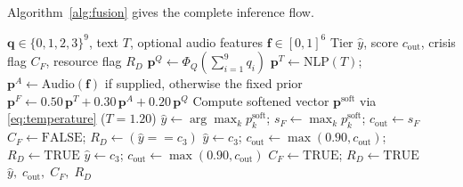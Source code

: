 \documentclass[10pt, conference, letterpaper]{IEEEtran}
\begin{document}
\begin{table}[!t]
\caption{HRE Module: Complete Decision Matrix}
\label{tab:hre}
\centering
{}
\end{table}

Algorithm~\ref{alg:fusion} gives the complete inference flow.

\begin{algorithm}[!t]
\caption{MindScreen Tri-Modal Inference with HRE}
\label{alg:fusion}
\begin{algorithmic}[1]
\REQUIRE $\mathbf{q} \in \{0,1,2,3\}^9$, text $T$, optional audio features $\mathbf{f} \in [0,1]^6$
\ENSURE Tier $\hat{y}$, score $c_{\text{out}}$, crisis flag $C_F$, resource flag $R_D$
\STATE $\mathbf{p}^Q \leftarrow \Phi_Q\!\left(\sum_{i=1}^9 q_i\right)$
\STATE $\mathbf{p}^T \leftarrow \text{NLP}(T)$;\; $\mathbf{p}^A \leftarrow \text{Audio}(\mathbf{f})$ if supplied, otherwise the fixed prior
\STATE $\mathbf{p}^F \leftarrow 0.50\,\mathbf{p}^T + 0.30\,\mathbf{p}^A + 0.20\,\mathbf{p}^Q$
\STATE Compute softened vector $\mathbf{p}^{\text{soft}}$ via \eqref{eq:temperature} ($T=1.20$)
\STATE $\hat{y} \leftarrow \arg\max_k p_k^{\text{soft}}$;\; $s_F \leftarrow \max_k p_k^{\text{soft}}$;\; $c_{\text{out}} \leftarrow s_F$
\STATE $C_F \leftarrow \text{FALSE}$;\; $R_D \leftarrow (\hat{y} == c_3)$
  \STATE $\hat{y} \leftarrow c_3$;\; $c_{\text{out}} \leftarrow \max(0.90, c_{\text{out}})$;\; $R_D \leftarrow \text{TRUE}$
\ENDIF
{}
  \STATE $\hat{y} \leftarrow c_3$;\; $c_{\text{out}} \leftarrow \max(0.90, c_{\text{out}})$
  \STATE $C_F \leftarrow \text{TRUE}$;\; $R_D \leftarrow \text{TRUE}$
\ENDIF
\RETURN $\hat{y},\; c_{\text{out}},\; C_F,\; R_D$
\end{algorithmic}
\end{algorithm}
\end{document}

